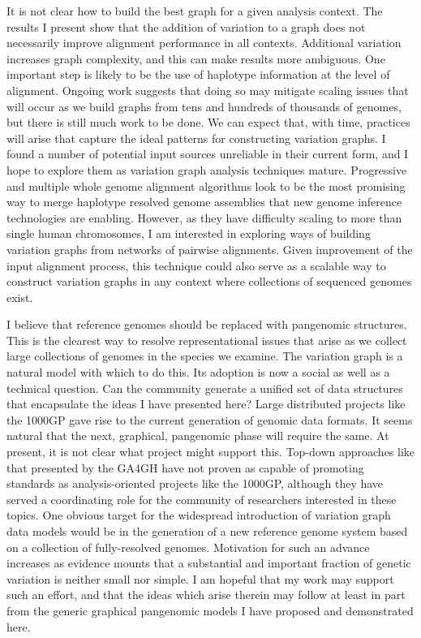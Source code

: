 It is not clear how to build the best graph for a given analysis context.
The results I present show that the addition of variation to a graph does not necessarily improve alignment performance in all contexts.
Additional variation increases graph complexity, and this can make results more ambiguous.
One important step is likely to be the use of haplotype information at the level of alignment.
Ongoing work suggests that doing so may mitigate scaling issues that will occur as we build graphs from tens and hundreds of thousands of genomes, but there is still much work to be done.
We can expect that, with time, practices will arise that capture the ideal patterns for constructing variation graphs.
I found a number of potential input sources unreliable in their current form, and I hope to explore them as variation graph analysis techniques mature.
Progressive and multiple whole genome alignment algorithms look to be the most promising way to merge haplotype resolved genome assemblies that new genome inference technologies are enabling.
However, as they have difficulty scaling to more than single human chromosomes, I am interested in exploring ways of building variation graphs from networks of pairwise alignments. 
Given improvement of the input alignment process, this technique could also serve as a scalable way to construct variation graphs in any context where collections of sequenced genomes exist.

I believe that reference genomes should be replaced with pangenomic structures.
This is the clearest way to resolve representational issues that arise as we collect large collections of genomes in the species we examine.
The variation graph is a natural model with which to do this.
Its adoption is now a social as well as a technical question.
Can the community generate a unified set of data structures that encapsulate the ideas I have presented here?
Large distributed projects like the 1000GP gave rise to the current generation of genomic data formats.
It seems natural that the next, graphical, pangenomic phase will require the same.
At present, it is not clear what project might support this.
Top-down approaches like that presented by the GA4GH have not proven as capable of promoting standards as analysis-oriented projects like the 1000GP, although they have served a coordinating role for the community of researchers interested in these topics.
One obvious target for the widespread introduction of variation graph data models would be in the generation of a new reference genome system based on a collection of fully-resolved genomes.
Motivation for such an advance increases as evidence mounts that a substantial and important fraction of genetic variation is neither small nor simple.
I am hopeful that my work may support such an effort, and that the ideas which arise therein may follow at least in part from the generic graphical pangenomic models I have proposed and demonstrated here.
